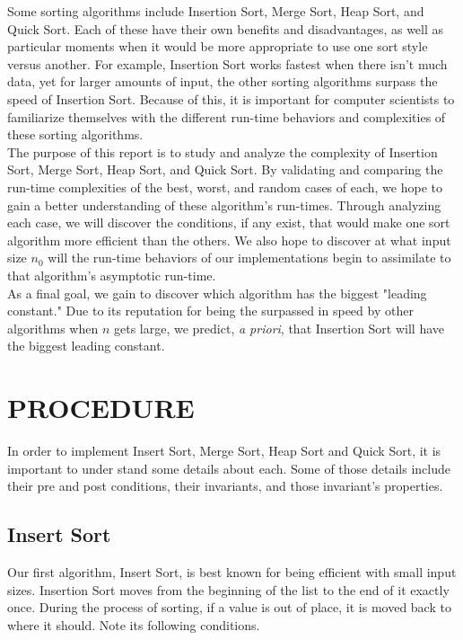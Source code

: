 \documentclass[12pt]{article}
\begin{document}
Some sorting algorithms include Insertion Sort, Merge Sort, Heap Sort, and Quick Sort. Each of these have their own benefits and disadvantages, as well as particular moments when it would be more appropriate to use one sort style versus another. For example, Insertion Sort works fastest when there isn't much data, yet for larger amounts of input, the other sorting algorithms surpass the speed of Insertion Sort. Because of this, it is important for computer scientists to familiarize themselves with the different run-time behaviors and complexities of these sorting algorithms.\\


The purpose of this report is to study and analyze the complexity of Insertion Sort, Merge Sort, Heap Sort, and Quick Sort. By validating and comparing the run-time complexities of the best, worst, and random cases of each, we hope to gain a better understanding of these algorithm's run-times. Through analyzing each case, we will discover the conditions, if any exist, that would make one sort algorithm more efficient than the others. We also hope to discover at what input size $n_0$ will the run-time behaviors of our implementations begin to assimilate to that algorithm's asymptotic run-time. \\

As a final goal, we gain to discover which algorithm has the biggest "leading constant." Due to its reputation for being the surpassed in speed by other algorithms when $n$ gets large, we predict, \textit{a priori}, that Insertion Sort will have the biggest leading constant.


\section*{PROCEDURE} 
In order to implement Insert Sort, Merge Sort, Heap Sort and Quick Sort, it is important to under stand some details about each. Some of those details include their pre and post conditions, their invariants, and those invariant's properties. \\

\subsection*{Insert Sort}

Our first algorithm, Insert Sort, is best known for being efficient with small input sizes. Insertion Sort moves from the beginning of the list to the end of it exactly once. During the process of sorting, if a value is out of place, it is moved back to where it should.  Note its following conditions.\\
\end{document}
